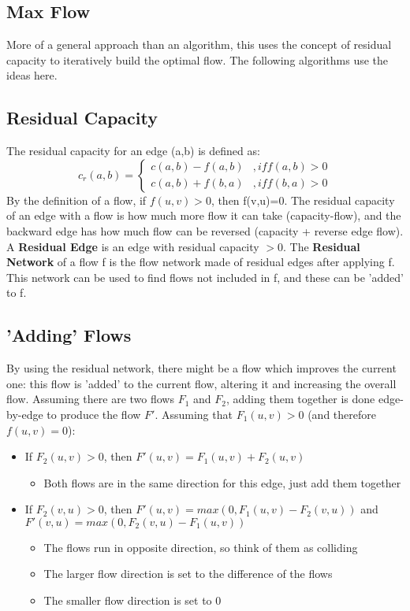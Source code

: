 \subsection{Max Flow}
More of a general approach than an algorithm, this uses the concept of residual capacity to iteratively build the optimal flow. The following algorithms use the ideas here. 

\subsection{Residual Capacity}
The residual capacity for an edge (a,b) is defined as:
\begin{equation}
    c_r(a,b) = 
    \begin{cases}
        c(a,b) - f(a,b) &, if f(a,b) > 0 \\
        c(a,b) + f(b,a) &, if f(b,a) > 0
    \end{cases}
\end{equation}
By the definition of a flow, if $f(u,v)>0$, then f(v,u)=0. The residual capacity of an edge with a flow is how much more flow it can take (capacity-flow), and the backward edge has how much flow can be reversed (capacity + reverse edge flow). \\
A \textbf{Residual Edge} is an edge with residual capacity $>0$. The \textbf{Residual Network} of a flow f is the flow network made of residual edges after applying f. This network can be used to find flows not included in f, and these can be 'added' to f.

\subsection{'Adding' Flows}
By using the residual network, there might be a flow which improves the current one: this flow is 'added' to the current flow, altering it and increasing the overall flow. Assuming there are two flows $F_1$ and $F_2$, adding them together is done edge-by-edge to produce the flow $F'$. Assuming that $F_1(u,v) > 0$ (and therefore $f(u,v)=0$):
\begin{itemize}
    \item If $F_2(u,v) > 0$, then $F'(u,v) = F_1(u,v) + F_2(u,v)$
        \begin{itemize}
            \item Both flows are in the same direction for this edge, just add them together
        \end{itemize}
    \item If $F_2(v,u) > 0$, then $F'(u,v) = max(0, F_1(u,v) - F_2(v,u))$ and $F'(v,u) = max(0, F_2(v,u) - F_1(u,v))$
        \begin{itemize}
            \item The flows run in opposite direction, so think of them as colliding
            \item The larger flow direction is set to the difference of the flows
            \item The smaller flow direction is set to 0
        \end{itemize}    
\end{itemize}

